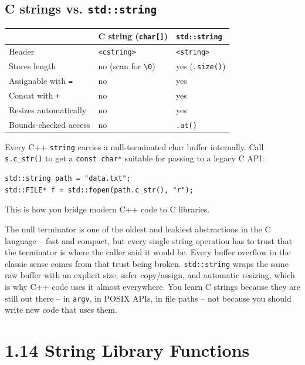 \documentclass[11pt]{article}
\begin{document}
\subsection{C strings vs. \texttt{std::string}}

\begin{center}
\begin{tabular}{lll}
& \textbf{C string} (\texttt{char[]}) & \texttt{std::string} \\
\hline
Header & \texttt{<cstring>} & \texttt{<string>} \\
Stores length & no (scan for \texttt{\textbackslash0}) & yes (\texttt{.size()}) \\
Assignable with \texttt{=} & no & yes \\
Concat with \texttt{+} & no & yes \\
Resizes automatically & no & yes \\
Bounds-checked access & no & \texttt{.at()} \\
\end{tabular}
\end{center}

\begin{notebox}
Every C++ \texttt{string} carries a null-terminated char buffer
internally. Call \texttt{s.c\_str()} to get a \texttt{const char*}
suitable for passing to a legacy C API:
\begin{verbatim}
std::string path = "data.txt";
std::FILE* f = std::fopen(path.c_str(), "r");
\end{verbatim}
This is how you bridge modern C++ code to C libraries.
\end{notebox}

\begin{ideabox}
The null terminator is one of the oldest and leakiest abstractions in
the C language -- fast and compact, but every single string operation
has to trust that the terminator is where the caller said it would be.
Every buffer overflow in the classic sense comes from that trust being
broken. \texttt{std::string} wraps the same raw buffer with an explicit
size, safer copy/assign, and automatic resizing, which is why C++ code
uses it almost everywhere. You learn C strings because they are still
out there -- in \texttt{argv}, in POSIX APIs, in file paths -- not
because you should write new code that uses them.
\end{ideabox}

\section{1.14 String Library Functions}
\end{document}
